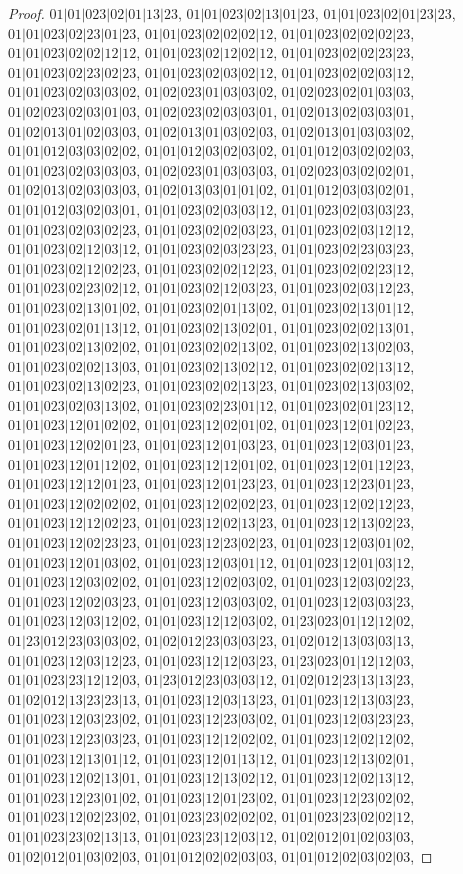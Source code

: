 \documentclass[12pt]{article}
\theoremstyle{plain}
\theoremstyle{definition}
\theoremstyle{remark}
\begin{document}
\begin{proof}
$01|01|023|02|01|13|23$, $01|01|023|02|13|01|23$, $01|01|023|02|01|23|23$, $01|01|023|02|23|01|23$, $01|01|023|02|02|02|12$, $01|01|023|02|02|02|23$, $01|01|023|02|02|12|12$, $01|01|023|02|12|02|12$, $01|01|023|02|02|23|23$, $01|01|023|02|23|02|23$, $01|01|023|02|03|02|12$, $01|01|023|02|02|03|12$, $01|01|023|02|03|03|02$, $01|02|023|01|03|03|02$, $01|02|023|02|01|03|03$, $01|02|023|02|03|01|03$, $01|02|023|02|03|03|01$, $01|02|013|02|03|03|01$, $01|02|013|01|02|03|03$, $01|02|013|01|03|02|03$, $01|02|013|01|03|03|02$, $01|01|012|03|03|02|02$, $01|01|012|03|02|03|02$, $01|01|012|03|02|02|03$, $01|01|023|02|03|03|03$, $01|02|023|01|03|03|03$, $01|02|023|03|02|02|01$, $01|02|013|02|03|03|03$, $01|02|013|03|01|01|02$, $01|01|012|03|03|02|01$, $01|01|012|03|02|03|01$, $01|01|023|02|03|03|12$, $01|01|023|02|03|03|23$, $01|01|023|02|03|02|23$, $01|01|023|02|02|03|23$, $01|01|023|02|03|12|12$, $01|01|023|02|12|03|12$, $01|01|023|02|03|23|23$, $01|01|023|02|23|03|23$, $01|01|023|02|12|02|23$, $01|01|023|02|02|12|23$, $01|01|023|02|02|23|12$, $01|01|023|02|23|02|12$, $01|01|023|02|12|03|23$, $01|01|023|02|03|12|23$, $01|01|023|02|13|01|02$, $01|01|023|02|01|13|02$, $01|01|023|02|13|01|12$, $01|01|023|02|01|13|12$, $01|01|023|02|13|02|01$, $01|01|023|02|02|13|01$, $01|01|023|02|13|02|02$, $01|01|023|02|02|13|02$, $01|01|023|02|13|02|03$, $01|01|023|02|02|13|03$, $01|01|023|02|13|02|12$, $01|01|023|02|02|13|12$, $01|01|023|02|13|02|23$, $01|01|023|02|02|13|23$, $01|01|023|02|13|03|02$, $01|01|023|02|03|13|02$, $01|01|023|02|23|01|12$, $01|01|023|02|01|23|12$, $01|01|023|12|01|02|02$, $01|01|023|12|02|01|02$, $01|01|023|12|01|02|23$, $01|01|023|12|02|01|23$, $01|01|023|12|01|03|23$, $01|01|023|12|03|01|23$, $01|01|023|12|01|12|02$, $01|01|023|12|12|01|02$, $01|01|023|12|01|12|23$, $01|01|023|12|12|01|23$, $01|01|023|12|01|23|23$, $01|01|023|12|23|01|23$, $01|01|023|12|02|02|02$, $01|01|023|12|02|02|23$, $01|01|023|12|02|12|23$, $01|01|023|12|12|02|23$, $01|01|023|12|02|13|23$, $01|01|023|12|13|02|23$, $01|01|023|12|02|23|23$, $01|01|023|12|23|02|23$, $01|01|023|12|03|01|02$, $01|01|023|12|01|03|02$, $01|01|023|12|03|01|12$, $01|01|023|12|01|03|12$, $01|01|023|12|03|02|02$, $01|01|023|12|02|03|02$, $01|01|023|12|03|02|23$, $01|01|023|12|02|03|23$, $01|01|023|12|03|03|02$, $01|01|023|12|03|03|23$, $01|01|023|12|03|12|02$, $01|01|023|12|12|03|02$, $01|23|023|01|12|12|02$, $01|23|012|23|03|03|02$, $01|02|012|23|03|03|23$, $01|02|012|13|03|03|13$, $01|01|023|12|03|12|23$, $01|01|023|12|12|03|23$, $01|23|023|01|12|12|03$, $01|01|023|23|12|12|03$, $01|23|012|23|03|03|12$, $01|02|012|23|13|13|23$, $01|02|012|13|23|23|13$, $01|01|023|12|03|13|23$, $01|01|023|12|13|03|23$, $01|01|023|12|03|23|02$, $01|01|023|12|23|03|02$, $01|01|023|12|03|23|23$, $01|01|023|12|23|03|23$, $01|01|023|12|12|02|02$, $01|01|023|12|02|12|02$, $01|01|023|12|13|01|12$, $01|01|023|12|01|13|12$, $01|01|023|12|13|02|01$, $01|01|023|12|02|13|01$, $01|01|023|12|13|02|12$, $01|01|023|12|02|13|12$, $01|01|023|12|23|01|02$, $01|01|023|12|01|23|02$, $01|01|023|12|23|02|02$, $01|01|023|12|02|23|02$, $01|01|023|23|02|02|02$, $01|01|023|23|02|02|12$, $01|01|023|23|02|13|13$, $01|01|023|23|12|03|12$, $01|02|012|01|02|03|03$, $01|02|012|01|03|02|03$, $01|01|012|02|02|03|03$, $01|01|012|02|03|02|03$, 
\end{proof}
\end{document}
